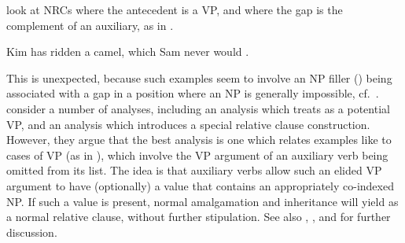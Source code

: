 \documentclass[output=paper
 	        ,biblatex
                ,babelshorthands
                ,newtxmath
                ,draftmode
                ,colorlinks, citecolor=brown
]{langscibook}
\begin{document}
\citet{Arnold:Borsley:10}\label{page-relative-clauses:stranded-aux} look at NRCs where the antecedent is a VP, and where the gap is the
complement of an auxiliary, as in .
\begin{exe}\ex
  \label{x:rc-115}Kim has ridden a camel, which Sam never would \trace.   
\end{exe}
This is unexpected, because such examples seem to involve an NP filler () being
associated with a gap in a position where an NP is generally impossible, cf.\ . \citeauthor{Arnold:Borsley:10} consider a number of
analyses, including an analysis which treats  as a potential VP, and an
analysis which introduces a special relative clause construction. However, they argue that
the best analysis is one which relates examples like  to cases of VP 
(as in ), which involve the VP argument of
an auxiliary verb being omitted from its \comps list. The idea is that auxiliary
verbs allow such an elided VP argument to have (optionally) a  value that
contains an appropriately co-indexed NP. If such a  value is present, normal
 amalgamation and inheritance will yield  as a normal relative
clause, without further stipulation. See also ,
  ,  and 
for further discussion.
  
\end{document}
